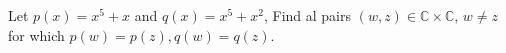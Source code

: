 Let \(p(x)=x^5+x\) and \(q(x)=x^5+x^2\), Find al pairs \((w,z)\in \mathbb{C}\times\mathbb{C}\), \(w\not=z\) for which \(p(w)=p(z),q(w)=q(z)\).